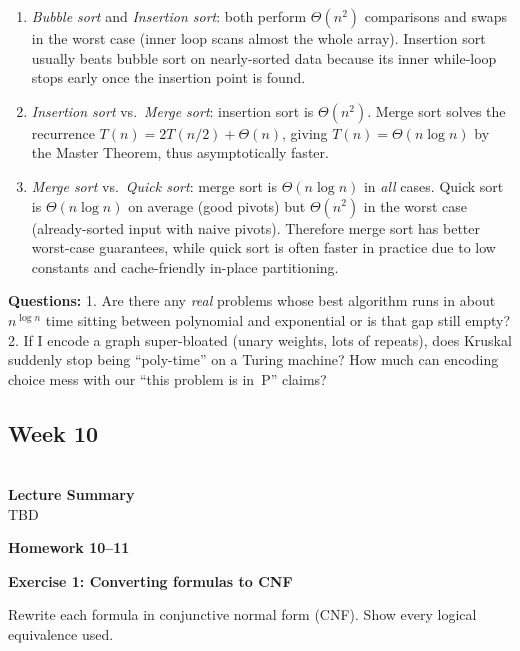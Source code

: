 \documentclass{article}
\theoremstyle{theorem}
\theoremstyle{definition}
\theoremstyle{remark}
\begin{document}
\begin{enumerate}
  \item \emph{Bubble sort} and \emph{Insertion sort}:  
        both perform $\Theta(n^{2})$ comparisons and swaps in the worst case  
        (inner loop scans almost the whole array).  
        Insertion sort usually beats bubble sort on nearly-sorted data because
        its inner while-loop stops early once the insertion point is found.

  \item \emph{Insertion sort} vs.\ \emph{Merge sort}:  
        insertion sort is $\Theta(n^{2})$.  
        Merge sort solves the recurrence $T(n)=2T(n/2)+\Theta(n)$,  
        giving $T(n)=\Theta(n\log n)$ by the Master Theorem, thus asymptotically faster.

  \item \emph{Merge sort} vs.\ \emph{Quick sort}:  
        merge sort is $\Theta(n\log n)$ in \emph{all} cases.  
        Quick sort is $\Theta(n\log n)$ on average (good pivots) but  
        $\Theta(n^{2})$ in the worst case (already-sorted input with naive pivots).  
        Therefore merge sort has better worst-case guarantees,  
        while quick sort is often faster in practice due to low constants  
        and cache-friendly in-place partitioning.
\end{enumerate}
\textbf{Questions: } 1. Are there any \emph{real} problems whose best algorithm runs in about $n^{\log n}$ time sitting between polynomial and exponential or is that gap still empty?  2. If I encode a graph super-bloated (unary weights, lots of repeats), does Kruskal suddenly stop being ``poly-time'' on a Turing machine? How much can encoding choice mess with our ``this problem is in~P'' claims?

\subsection{\textbf{Week 10}}\\
\textbf{Lecture Summary}\\
TBD

\bigskip
\textbf{Homework 10--11}

\bigskip
\textbf{Exercise 1: Converting formulas to CNF}

Rewrite each formula in conjunctive normal form (CNF).  Show every logical equivalence used.
\end{document}
